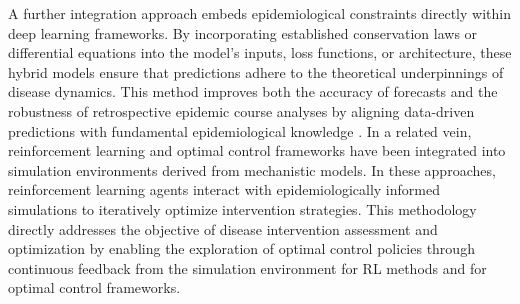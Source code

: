 A further integration approach embeds epidemiological constraints directly within deep learning frameworks. By incorporating established conservation laws or differential equations into the model’s inputs, loss functions, or architecture, these hybrid models ensure that predictions adhere to the theoretical underpinnings of disease dynamics. This method improves both the accuracy of forecasts and the robustness of retrospective epidemic course analyses by aligning data-driven predictions with fundamental epidemiological knowledge \cite{kharazmi_identifiability_2021,barmparis_physicsinformed_2022,de_rosa_modelling_2023,torku_seinn_2023,berkhahn_physics-informed_2022,rodriguez_einns_2023,shaier_data-driven_2022,bertaglia_asymptotic-preserving_2022,malinzi_determining_2022}. In a related vein, reinforcement learning and optimal control frameworks have been integrated into simulation environments derived from mechanistic models. In these approaches, reinforcement learning agents interact with epidemiologically informed simulations to iteratively optimize intervention strategies. This methodology directly addresses the objective of disease intervention assessment and optimization by enabling the exploration of optimal control policies through continuous feedback from the simulation environment \cite{yao_optimal_2023,zou_data-efficient_2021,vereshchaka_optimization_2021,song_reinforced_2020,probert_context_2019,ohi_exploring_2020,khadilkar_optimising_2020,hao_reinforcement_2022,libin_deep_2021,awasthi_vacsim_2022,song_robust_2023,padmanabhan_reinforcement_2021,kompella_reinforcement_2020,mai_planning_2023,asikis_neural_2022,roy_knowledge_2021,colas_epidemioptim_2021,capobianco_agent-based_2021,ou_active_2021,trad_towards_2022,bushaj_simulation-deep_2022,chadi_2022 ,guo_pacar_2022,kulkarni_optimizing_2022,deng_optimal_2021,hwang_optimal_2022,wan_multi-objective_2022,miralles-pechuan_methodology_2020,bampa_epidrlearn_2022,shami_economic_2022,du_district-coupled_2022,benalcazar_deep_2021,xia_controlling_2022,khatami_reinforcement_2021,zong_reinforcement_2022,du_hrl4ec_2023,nguyen_general_2022,beigi_application_2021} for RL methods and \cite{yin_optimal_2023,asikis_neural_2022,courtes_reduced_2024,li_robust_2021,kmet_neural_2023,kmet_bezier_2019} for optimal control frameworks.

